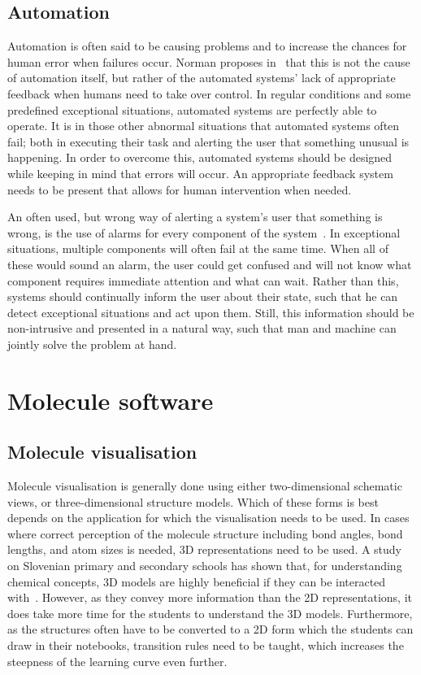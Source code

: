 \subsection{Automation}
Automation is often said to be causing problems and to increase the chances for human error when failures occur. Norman proposes in~\cite{norman1990problem} that this is not the cause of automation itself, but rather of the automated systems' lack of appropriate feedback when humans need to take over control. In regular conditions and some predefined exceptional situations, automated systems are perfectly able to operate. It is in those other abnormal situations that automated systems often fail; both in executing their task and alerting the user that something unusual is happening. In order to overcome this, automated systems should be designed while keeping in mind that errors will occur. An appropriate feedback system needs to be present that allows for human intervention when needed.

An often used, but wrong way of alerting a system's user that something is wrong, is the use of alarms for every component of the system~\cite{norman1990problem}. In exceptional situations, multiple components will often fail at the same time. When all of these would sound an alarm, the user could get confused and will not know what component requires immediate attention and what can wait. Rather than this, systems should continually inform the user about their state, such that he can detect exceptional situations and act upon them. Still, this information should be non-intrusive and presented in a natural way, such that man and machine can jointly solve the problem at hand.



\section{Molecule software}


\subsection{Molecule visualisation}
Molecule visualisation is generally done using either two-dimensional schematic views, or three-dimensional structure models. Which of these forms is best depends on the application for which the visualisation needs to be used. In cases where correct perception of the molecule structure including bond angles, bond lengths, and atom sizes is needed, 3D representations need to be used. A study on Slovenian primary and secondary schools has shown that, for understanding chemical concepts, 3D models are highly beneficial if they can be interacted with~\cite{ferk2003students}. However, as they convey more information than the 2D representations, it does take more time for the students to understand the 3D models. Furthermore, as the structures often have to be converted to a 2D form which the students can draw in their notebooks, transition rules need to be taught, which increases the steepness of the learning curve even further.

